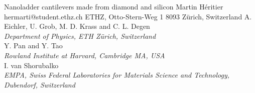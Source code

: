 \begin{conf-abstract}[]
{Nanoladder cantilevers made from diamond and silicon}
{\color{blue} Martin Héritier}
{hermarti@student.ethz.ch}
{ETHZ, Otto-Stern-Weg 1 8093 Zürich, Switzerland}
{{\color{blue}A. Eichler, U. Grob, M. D. Krass and C. L. Degen}\\ \textit{Department of Physics, ETH Zürich, Switzerland}\\ 
{\color{blue}Y. Pan and Y. Tao}\\ \textit{ Rowland Institute at Harvard, Cambridge MA, USA}\\ 
{\color{blue}I. van Shorubalko}\\ \textit{EMPA, Swiss Federal Laboratories for Materials Science and Technology, Dubendorf, Switzerland}\\ 
\decofourleft \decofourright}





\printbibliography[heading=none]

\end{conf-abstract}
